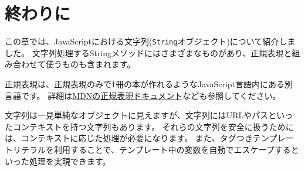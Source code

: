 \hypertarget{string-summary}{%
\section{終わりに}\label{string-summary}}

この章では、JavaScriptにおける文字列(\texttt{String}オブジェクト)について紹介しました。
文字列処理するStringメソッドにはさまざまなものがあり、正規表現と組み合わせて使うものも含まれます。

正規表現は、正規表現のみで1冊の本が作れるようなJavaScript言語内にある別言語です。
詳細は\href{https://developer.mozilla.org/ja/docs/Web/JavaScript/Guide/Regular_Expressions}{MDNの正規表現ドキュメント}なども参照してください。

文字列は一見単純なオブジェクトに見えますが、文字列にはURLやパスといったコンテキストを持つ文字列もあります。
それらの文字列を安全に扱うためには、コンテキストに応じた処理が必要になります。
また、タグつきテンプレートリテラルを利用することで、テンプレート中の変数を自動でエスケープするといった処理を実現できます。
